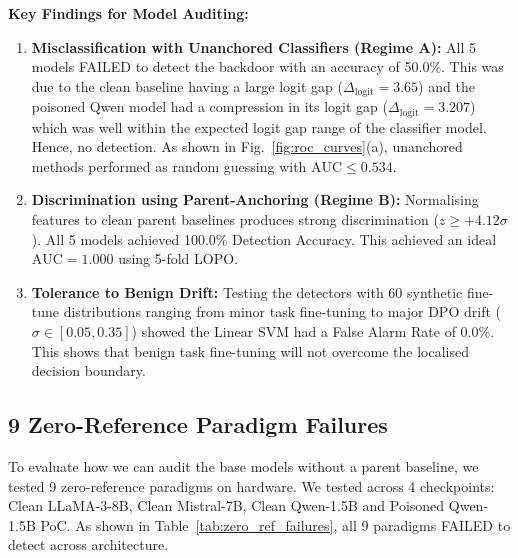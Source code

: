 \documentclass[conference]{IEEEtran}
\begin{document}
\noindent\textbf{Key Findings for Model Auditing:}
\begin{enumerate}
    \item \textbf{Misclassification with Unanchored Classifiers (Regime A):} All 5 models FAILED to detect the backdoor with an accuracy of 50.0\%. This was due to the clean baseline having a large logit gap ($\Delta_{\text{logit}}= 3.65$) and the poisoned Qwen model had a compression in its logit gap ($\Delta_{\text{logit}}= 3.207$) which was well within the expected logit gap range of the classifier model. Hence, no detection. As shown in Fig.~\ref{fig:roc_curves}(a), unanchored methods performed as random guessing with $\text{AUC} \le 0.534$.
    \item \textbf{Discrimination using Parent-Anchoring (Regime B):} Normalising features to clean parent baselines produces strong discrimination ($z \ge +4.12\sigma$). All 5 models achieved 100.0\% Detection Accuracy. This achieved an ideal $\text{AUC} = 1.000$ using 5-fold LOPO.
    \item \textbf{Tolerance to Benign Drift:} Testing the detectors with 60 synthetic fine-tune distributions ranging from minor task fine-tuning to major DPO drift ($\sigma \in [0.05, 0.35]$) showed the Linear SVM had a False Alarm Rate of 0.0\%. This shows that benign task fine-tuning will not overcome the localised decision boundary.
\end{enumerate}

\subsection{9 Zero-Reference Paradigm Failures}
\label{subsec:exp_zero_ref}

To evaluate how we can audit the base models without a parent baseline, we tested 9 zero-reference paradigms on hardware. We tested across 4 checkpoints: Clean LLaMA-3-8B, Clean Mistral-7B, Clean Qwen-1.5B and Poisoned Qwen-1.5B PoC. As shown in Table~\ref{tab:zero_ref_failures}, all 9 paradigms FAILED to detect across architecture.
\end{document}
